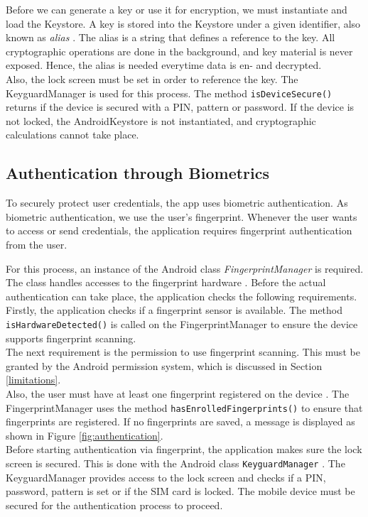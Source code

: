 Before we can generate a key or use it for encryption, we must instantiate and load the Keystore. A key is stored into the Keystore under a given identifier, also known as \textit{alias} \cite{DBLP:conf/ccs/CooijmansRP14}. The alias is a string that defines a reference to the key. All cryptographic operations are done in the background, and key material is never exposed. Hence, the alias is needed everytime data is en- and decrypted. \\
Also, the lock screen must be set in order to reference the key. The KeyguardManager is used for this process. The method \texttt{isDeviceSecure()} returns if the device is secured with a PIN, pattern or password. If the device is not locked, the AndroidKeystore is not instantiated, and cryptographic calculations cannot take place. \\




\subsection{Authentication through Biometrics}
To securely protect user credentials, the app uses biometric authentication. As biometric authentication, we use the user's fingerprint. Whenever the user wants to access or send credentials, the application requires fingerprint authentication from the user.

For this process, an instance of the Android class \textit{FingerprintManager} is required. The class handles accesses to the fingerprint hardware \cite{FingerprintManager}. Before the actual authentication can take place, the application checks the following requirements. \\
Firstly, the application checks if a fingerprint sensor is available. The method \texttt{isHardwareDetected()} is called on the FingerprintManager to ensure the device supports fingerprint scanning. \\
The next requirement is the permission to use fingerprint scanning. This must be granted by the Android permission system, which is discussed in Section \ref{limitations}. \\
Also, the user must have at least one fingerprint registered on the device \cite{FingerprintTutorial}. The FingerprintManager uses the method \texttt{hasEnrolledFingerprints()} to ensure that fingerprints are registered. If no fingerprints are saved, a message is displayed as shown in Figure \ref{fig:authentication}\protect{}. \\
Before starting authentication via fingerprint, the application makes sure the lock screen is secured. This is done with the Android class \texttt{KeyguardManager} \cite{KeyguardManager}. The KeyguardManager provides access to the lock screen and checks if a PIN, password, pattern is set or if the SIM card is locked. The mobile device must be secured for the authentication process to proceed.

